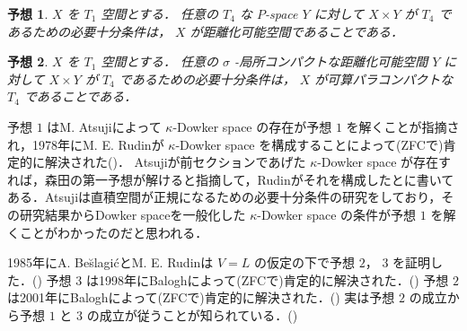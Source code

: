 \documentclass[leqno, 12pt]{ltjsarticle}
\newtheorem{conj}{予想}
\begin{document}
\begin{conj}
$X$
を
$T_{1}$
空間とする．
任意の
$T_{4}$
な
$P$-space
$Y$
に対して
$X\times Y$
が
$T_{4}$
であるための必要十分条件は，
$X$
が距離化可能空間であることである．
\end{conj}

\begin{conj}
$X$
を
$T_{1}$
空間とする．
任意の
$\sigma$
-局所コンパクトな距離化可能空間
$Y$
に対して
$X\times Y$
が
$T_{4}$
であるための必要十分条件は，
$X$
が可算パラコンパクトな
$T_{4}$
であることである．
\end{conj}

予想
$1$
はM. Atsujiによって
$\kappa$-Dowker space
の存在が予想
$1$
を解くことが指摘され，1978年にM. E. Rudinが
$\kappa$-Dowker space
を構成することによって(ZFCで)肯定的に解決された(\cite{2})．
Atsujiが前セクションであげた
$\kappa$-Dowker space
が存在すれば，森田の第一予想が解けると指摘して，Rudinがそれを構成したと\cite{2}に書いてある．Atsujiは直積空間が正規になるための必要十分条件の研究をしており，その研究結果からDowker spaceを一般化した
$\kappa$-Dowker space
の条件が予想
$1$
を解くことがわかったのだと思われる．

1985年にA. Be\u{s}lagi\'{c}とM. E. Rudinは
$V=L$
の仮定の下で予想
$2$，
$3$
を証明した．(\cite{BR})
予想
$3$
は1998年にBaloghによって(ZFCで)肯定的に解決された．(\cite{B1})
予想
$2$
は2001年にBaloghによって(ZFCで)肯定的に解決された．(\cite{B2})
実は予想
$2$
の成立から予想
$1$
と
$3$
の成立が従うことが知られている．(\cite{danma})
\end{document}
